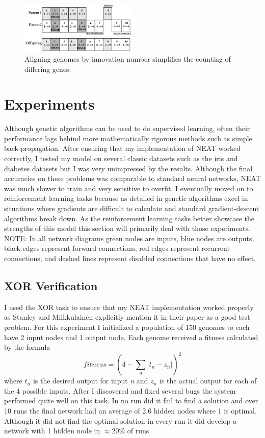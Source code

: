 \documentclass[twocolumn,letterpaper]{article}
\begin{document}
\begin{figure}[b]
	\centering
	\includegraphics[width=0.5\textwidth]{images/speciation.png}
	\caption{Aligning genomes by innovation number simplifies the counting of differing genes.}
	\label{fig:speciation}
\end{figure}
  
\section{Experiments} \label{sec:experiments}
Although genetic algorithms can be used to do supervised learning, often their performance lags behind
more mathematically rigorous methods such as simple back-propagation. After ensuring that my implementation of NEAT worked correctly, I tested my model on several classic datasets such as the iris and diabetes datasets but I was very unimpressed by the
results. Although the final accuracies on these problems was comparable to standard neural networks, NEAT was 
much slower to train and very sensitive to overfit. I eventually moved on to reinforcement learning tasks
because as detailed in \cite{whitley} genetic algorithms excel in situations where gradients are difficult to
calculate and standard gradient-descent algorithms break down. As the reinforcement learning tasks better
showcase the strengths of this model this section will primarily deal with those experiments. NOTE: In all
network diagrams green nodes are inputs, blue nodes are outputs, black edges represent forward connections,
red edges represent recurrent connections, and dashed lines represent disabled connections that have no
effect.

\subsection{XOR Verification} \label{sec:xor}
I used the XOR task to ensure that my NEAT implementation worked properly as Stanley and 
Miikkulainen explicitly mention it in their paper as a good test problem. For this experiment I 
initialized a population of 150 genomes to each have 2 input nodes and 1 output node. Each genome received
a fitness calculated by the formula 
\begin{equation}
fitness = (4-\sum_{n} \left|t_n-z_n\right|)^2 
\end{equation}
where $t_n$ is the desired output for input \textit{n} and $z_n$ is the actual output for each of the 4
possible inputs. After I discovered and fixed several bugs the system performed quite well on this task. 
In no run did it fail to find a solution and over 10 runs the final network had an average of 2.6 hidden
nodes where 1 is optimal. Although it did not find the optimal solution in every run it did develop a 
network with 1 hidden node in $\approx20\%$ of runs.
\end{document}
